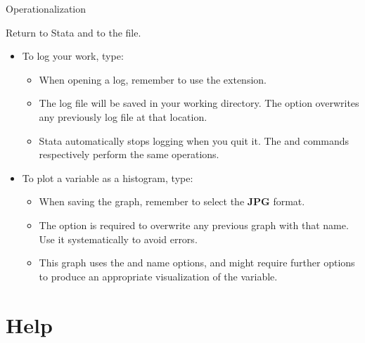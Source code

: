 \documentclass{beamer}
\begin{document}
	\begin{frame}[t]{Operationalization}
	
		Return to Stata and to the \textbf{} file.
		
		\begin{itemize}
			\item To log your work, type:
			
			
			\begin{itemize}
				\item When opening a log, remember to use the  extension.
				\item The log file will be saved in your working directory. The  option overwrites any previously log file at that location.
				\item Stata automatically stops logging when you quit it. The  and  commands respectively perform the same operations.
			\end{itemize}
			
			\item To plot a variable as a histogram, type:
			
			
			\begin{itemize}
				\item When saving the graph, remember to select the \textbf{JPG} format.
				\item The  option is required to overwrite any previous graph with that name. Use it systematically to avoid errors.
				\item This graph uses the  and {name} options, and might require further options to produce an appropriate visualization of the variable.
			\end{itemize}
		\end{itemize}	
	
	\end{frame}		

	\section{Help}
\end{document}
